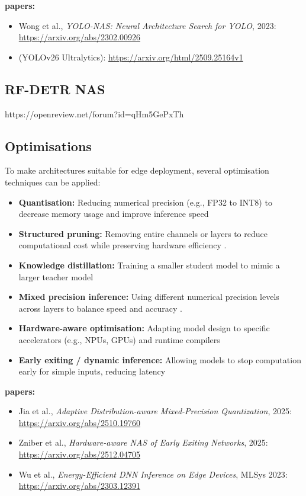 \documentclass{article}
\begin{document}
\textbf{papers:}
\begin{itemize}
    \item Wong et al., \emph{YOLO-NAS: Neural Architecture Search for YOLO}, 2023: \url{https://arxiv.org/abs/2302.00926}
    \item (YOLOv26 Ultralytics): \url{https://arxiv.org/html/2509.25164v1}
\end{itemize}

\subsection{RF-DETR NAS}
https://openreview.net/forum?id=qHm5GePxTh

\subsection{Optimisations}

To make architectures suitable for edge deployment, several optimisation techniques can be applied:

\begin{itemize}
    \item \textbf{Quantisation:} Reducing numerical precision (e.g., FP32 to INT8) to decrease memory usage and improve inference speed 
    \item \textbf{Structured pruning:} Removing entire channels or layers to reduce computational cost while preserving hardware efficiency \cite{li2016pruning}.
    \item \textbf{Knowledge distillation:} Training a smaller student model to mimic a larger teacher model 
    \item \textbf{Mixed precision inference:} Using different numerical precision levels across layers to balance speed and accuracy \cite{micikevicius2017mixed}.
    \item \textbf{Hardware-aware optimisation:} Adapting model design to specific accelerators (e.g., NPUs, GPUs) and runtime compilers 
    \item \textbf{Early exiting / dynamic inference:} Allowing models to stop computation early for simple inputs, reducing latency 
\end{itemize}

\textbf{papers:}
\begin{itemize}
    \item Jia et al., \emph{Adaptive Distribution-aware Mixed-Precision Quantization}, 2025: \url{https://arxiv.org/abs/2510.19760}
    \item Zniber et al., \emph{Hardware-aware NAS of Early Exiting Networks}, 2025: \url{https://arxiv.org/abs/2512.04705}
    \item Wu et al., \emph{Energy-Efficient DNN Inference on Edge Devices}, MLSys 2023: \url{https://arxiv.org/abs/2303.12391}
\end{itemize}



\end{document}
